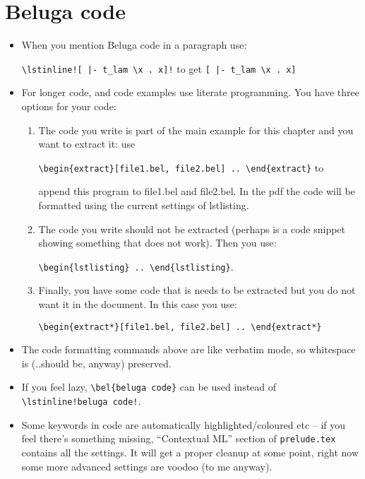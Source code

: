 \documentclass[12pt]{article}
\newcounter{chapter}
\begin{document}
\section{Beluga code}
\begin{itemize}
\item When you mention Beluga code in a paragraph use:

  \verb#\lstinline![ |- t_lam \x . x]!# to get \lstinline![ |- t_lam \x . x]!
\item For longer code, and code examples use literate programming. You have three options for your code:
  \begin{enumerate}
  \item The code you write is part of the main example for this
    chapter and you want to extract it: use

    \verb#\begin{extract}[file1.bel, file2.bel] .. \end{extract}# to

    append this program to file1.bel and file2.bel. In the pdf the
    code will be formatted using the current settings of lstlisting.
  \item The code you write should not be extracted (perhaps is a code
    snippet showing something that does not work). Then you use:

    \verb#\begin{lstlisting} .. \end{lstlisting}#.
  \item Finally, you have some code that is needs to be extracted but
    you do not want it in the document. In this case you use:

    \verb#\begin{extract*}[file1.bel, file2.bel] .. \end{extract*}#
  \end{enumerate}
\item The code formatting commands above are like verbatim mode, so whitespace is (..should be, anyway) preserved.
\item If you feel lazy, \verb#\bel{beluga code}# can be used instead of \\
  \verb#\lstinline!beluga code!#.
\item Some keywords in \beluga code are automatically highlighted/coloured etc -- if you feel there's something missing, ``Contextual ML'' section of \verb#prelude.tex# contains all the settings. It will get a proper cleanup at some point, right now some more advanced settings are voodoo (to me anyway).
\end{itemize}
\end{document}
